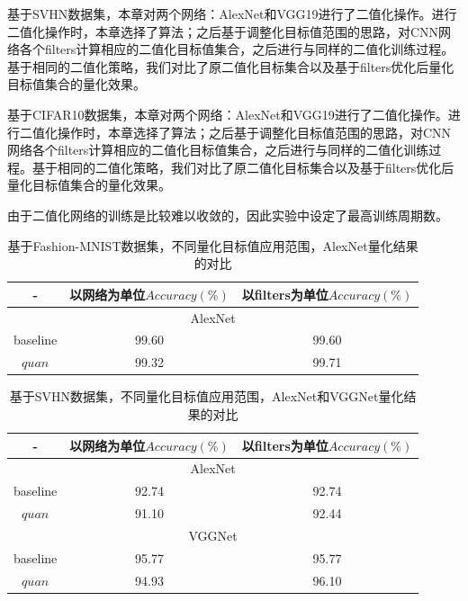\documentclass[ pdftex, oneside, master]{NJUthesis}
\begin{document}
基于SVHN数据集，本章对两个网络：AlexNet和VGG19进行了二值化操作。进行二值化操作时，本章选择了\cite{binary}算法；之后基于调整化目标值范围的思路，对CNN网络各个filters计算相应的二值化目标值集合，之后进行与\cite{binary}同样的二值化训练过程。基于相同的二值化策略\cite{binary}，我们对比了原二值化目标集合以及基于filters优化后量化目标值集合的量化效果。

基于CIFAR10数据集，本章对两个网络：AlexNet和VGG19进行了二值化操作。进行二值化操作时，本章选择了\cite{binary}算法；之后基于调整化目标值范围的思路，对CNN网络各个filters计算相应的二值化目标值集合，之后进行与\cite{binary}同样的二值化训练过程。基于相同的二值化策略\cite{binary}，我们对比了原二值化目标集合以及基于filters优化后量化目标值集合的量化效果。

由于二值化网络的训练是比较难以收敛的，因此实验中设定了最高训练周期数。

\begin{table}[!htbp]
\caption{基于Fashion-MNIST数据集，不同量化目标值应用范围，AlexNet量化结果的对比}
\begin{tabular}{|c|c|c|}
\hline
- & 以网络为单位\cite{binary}$Accuracy(\%)$  & 以filters为单位$Accuracy(\%)$  \\ \hline
\multicolumn{3}{|c|}{AlexNet} \\ \hline
baseline & 99.60 & 99.60  \\ \hline
$quan$ & 99.32 & 99.71 \\
\hline
\hline
\end{tabular}
\label{quan_range1}
\end{table}


\begin{table}[!htbp]
\caption{基于SVHN数据集，不同量化目标值应用范围，AlexNet和VGGNet量化结果的对比}
\begin{tabular}{|c|c|c|}
\hline
- & 以网络为单位\cite{binary}$Accuracy(\%)$  & 以filters为单位$Accuracy(\%)$  \\ \hline
\multicolumn{3}{|c|}{AlexNet} \\ \hline
baseline & 92.74 & 92.74  \\ \hline
$quan$ & 91.10 & 92.44 \\
\hline
\hline
\multicolumn{3}{|c|}{VGGNet} \\ \hline
baseline & 95.77 & 95.77  \\ \hline
$quan$ & 94.93 & 96.10 \\ \hline
\end{tabular}
\label{quan_range2}
\end{table}
\end{document}
